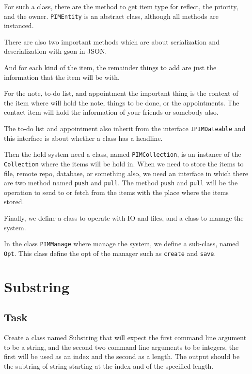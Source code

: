\documentclass{article}
\begin{document}
For such a class, there are the method to get item type for reflect, the priority, and the owner.
\lstinline|PIMEntity| is an abstract class, although all methods are instanced.

There are also two important methods which are about serialization and deserialization with gson in JSON.

And for each kind of the item, the remainder things to add are just the information that the item will be with.

For the note, to-do list, and appointment the important thing is the context of the item where will hold the note, things to be done, or the appointments. The contact item will hold the information of your friends or somebody also.

The to-do list and appointment also inherit from the interface
\lstinline|IPIMDateable| and this interface is about whether a class has a headline.
 

Then the hold system need a class, named \lstinline|PIMCollection|,
is an instance of the \lstinline|Collection| where the items will be hold in. When we need to store the items to file, remote repo, database, or something also, we need an interface in which there are two method named \lstinline|push| and \lstinline|pull|. The method \lstinline|push| and \lstinline|pull| will be the operation to send to or fetch from the items with the place where the items stored.

Finally, we define a class to operate with IO and files, and a class to manage the system.

In the class \lstinline|PIMManage| where manage the system, we define a sub-class, named \lstinline|Opt|. This class define the opt
of the manager such as \verb|create| and \verb|save|.





\section{Substring}
\label{sec:sub}

\subsection{Task}
\label{sec:sub:task}

Create a class named Substring that will expect the first command line argument to be a string,
and the second two command line arguments to be integers, the first will be used as an index and the second as a length.
The output should be the subtring of string starting at the index and of the specified length.
\end{document}
